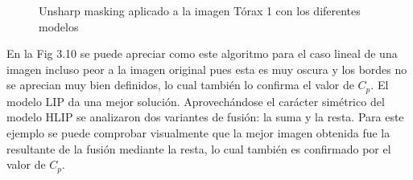 \begin{figure}
\begin{center}
		\caption{Unsharp masking aplicado a la imagen T\'orax 1 con los diferentes modelos}
	\end{center}
\end{figure}

En la Fig 3.10 se puede apreciar como este algoritmo para el caso lineal de una imagen incluso peor a la imagen original pues esta es muy oscura y los bordes no se aprecian muy bien definidos, lo cual tambi\'en lo confirma el valor de $C_p$. El modelo LIP da una mejor soluci\'on. Aprovech\'andose el car\'acter sim\'etrico del modelo HLIP se analizaron dos variantes de fusi\'on: la suma y la resta. Para este ejemplo se puede comprobar visualmente que la mejor imagen obtenida fue la resultante de la fusi\'on mediante la resta, lo cual tambi\'en es confirmado por el valor de $C_p$. 

